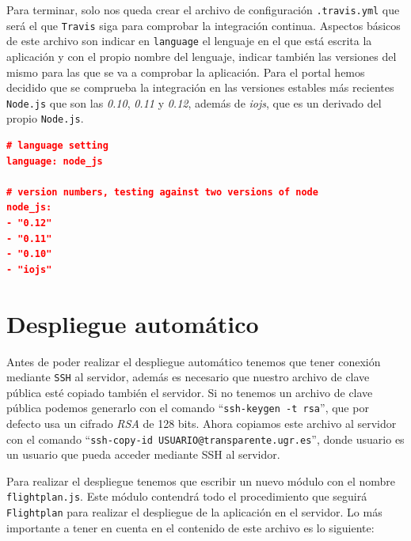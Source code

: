 Para terminar, solo nos queda crear el archivo de configuración {\tt .travis.yml} que será el que {\tt Travis} siga para comprobar la integración continua. Aspectos básicos de este archivo son indicar en {\tt language} el lenguaje en el que está escrita la aplicación y con el propio nombre del lenguaje, indicar también las versiones del mismo para las que se va a comprobar la aplicación. Para el portal hemos decidido que se comprueba la integración en las versiones estables más recientes {\tt Node.js} que son las \textit{0.10}, \textit{0.11} y \textit{0.12}, además de \textit{iojs}, que es un derivado del propio {\tt Node.js}.

\begin{lstlisting}[language=json,caption={Archivo de configuración de Travis CI},label={lst:json_personal}]
# language setting
language: node_js

# version numbers, testing against two versions of node
node_js:
- "0.12"
- "0.11"
- "0.10"
- "iojs"
\end{lstlisting}

\section{Despliegue automático}

Antes de poder realizar el despliegue automático tenemos que tener conexión mediante {\tt SSH} al servidor, además es necesario que nuestro archivo de clave pública esté copiado también el servidor. Si no tenemos un archivo de clave pública podemos generarlo con el comando ``{\tt ssh-keygen -t rsa}'', que por defecto usa un cifrado \textit{RSA} de 128 bits. Ahora copiamos este archivo al servidor con el comando ``{\tt ssh-copy-id USUARIO@transparente.ugr.es}'', donde usuario es un usuario que pueda acceder mediante SSH al servidor.

\bigskip

Para realizar el despliegue tenemos que escribir un nuevo módulo con el nombre {\tt flightplan.js}. Este módulo contendrá todo el procedimiento que seguirá {\tt Flightplan} para realizar el despliegue de la aplicación en el servidor. Lo más importante a tener en cuenta en el contenido de este archivo es lo siguiente:

